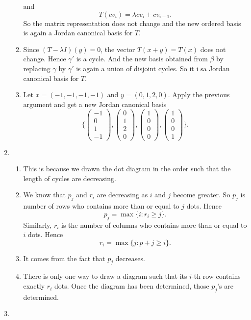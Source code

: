 \begin{enumerate}
\begin{enumerate}
and 
\[T(cv_i)=\lambda cv_i+cv_{i-1}.\]
So the matrix representation does not change and the new ordered basis is again a Jordan canonical basis for $T$.
\item Since $(T-\lambda I)(y)=0$, the vector $T(x+y)=T(x)$ does not change. Hence $\gamma'$ is a cycle. And the new basis obtained from $\beta$ by replacing $\gamma$ by $\gamma'$ is again a union of disjoint cycles. So it i sa Jordan canonical basis for $T$.
\item Let $x=(-1,-1,-1,-1)$ and $y=(0,1,2,0)$. Apply the previous argument and get a new Jordan canonical basis 
\[\{\begin{pmatrix}-1\\0\\1\\-1\end{pmatrix},\begin{pmatrix}0\\1\\2\\0\end{pmatrix},\begin{pmatrix}1\\0\\0\\0\end{pmatrix},\begin{pmatrix}1\\0\\0\\1\end{pmatrix}\}.\]
\end{enumerate}
\item \begin{enumerate}
\item This is because we drawn the dot diagram in the order such that the length of cycles are decreasing.
\item We know that $p_j$ and $r_i$ are decreasing as $i$ and $j$ become greater. So $p_j$ is number of rows who contains more than or equal to $j$ dots. Hence 
\[p_j=\max\{i:r_i\geq j\}.\]
Similarly, $r_i$ is the number of columns who contains more than or equal to $i$ dots. Hence 
\[r_i=\max\{j:p+j\geq i\}.\]
\item It comes from the fact that $p_j$ decreases.
\item There is only one way to draw a diagram such that its $i$-th row contains exactly $r_i$ dots. Once the diagram has been determined, those $p_j$'s are determined.
\end{enumerate}
\item \begin{enumerate}

\end{enumerate}
\end{enumerate}
